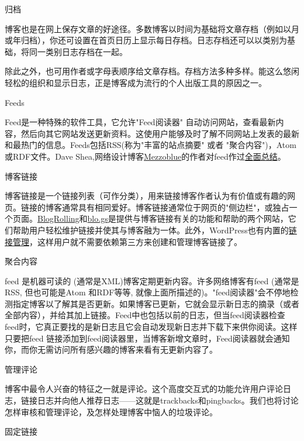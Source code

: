 \begin{compactitem}
\item 归档

博客也是在网上保存文章的好途径。多数博客以时间为基础将文章存档（例如以月或年归档），你还可设置在首页日历上显示每日存档。日志存档还可以以类别为基础，将同一类别日志存档在一起。

除此之外，也可用作者或字母表顺序给文章存档。存档方法多种多样。能这么悠闲轻松的组织和显示日志，正是博客成为流行的个人出版工具的原因之一。

\item Feeds

Feed是一种特殊的软件工具，它允许"Feed阅读器" 自动访问网站，查看最新内容，然后向其它网站发送更新资料。这使用户能够及时了解不同网站上发表的最新和最热门的信息。Feeds包括RSS(称为"丰富的站点摘要" 或者 "聚合内容")，Atom或RDF文件。Dave Shea,网络设计博客\href{http://mezzoblue.com/}{Mezzoblue}的作者对feed作过\href{http://www.mezzoblue.com/archives/2004/05/19/what_is_rssx/}{全面总结}。

\item 博客链接

博客链接是一个链接列表（可作分类），用来链接博客作者认为有价值或有趣的网页。链接的博客通常具有相同爱好。博客链接通常位于网页的"侧边栏"，或独占一个页面。\href{http://blogrolling.com/}{BlogRolling}和\href{http://blo.gs/}{blo.gs}是提供与博客链接有关的功能和帮助的两个网站，它们帮助用户轻松维护链接并使其与博客融为一体。此外，WordPress也有内置的\href{http://codex.wordpress.org/Links_Manager}{链接管理}，这样用户就不需要依赖第三方来创建和管理博客链接了。

\item 聚合内容

feed 是机器可读的 (通常是XML)博客定期更新内容。许多网络博客有feed (通常是 RSS, 但也可能是Atom 和RDF等等, 就像上面所描述的)。"feed阅读器"会不停地检测指定博客以了解其是否更新。如果博客已更新，它就会显示新日志的摘录（或者全部内容），并给其加上链接。Feed中也包括以前的日志，但当feed阅读器检查feed时，它真正要找的是新日志且它会自动发现新日志并下载下来供你阅读。这样只要把feed 链接添加到feed阅读器里，当博客新增文章时，Feed阅读器就会通知你，而你无需访问所有感兴趣的博客来看有无更新内容了。

\item 管理评论

博客中最令人兴奋的特征之一就是评论。这个高度交互式的功能允许用户评论日志，链接日志并向他人推荐日志——这就是trackbacks和pingbacks。我们也将讨论怎样审核和管理评论，及怎样处理博客中恼人的垃圾评论。

\item 固定链接


\end{compactitem}
